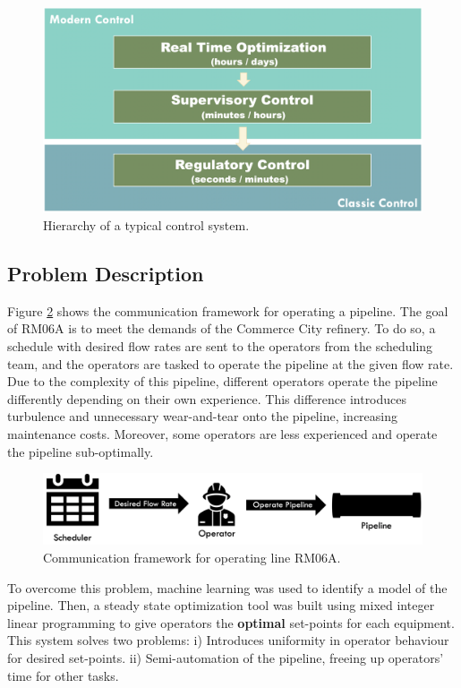\begin{figure}[h]
    \centering
    \includegraphics[scale=0.15]{images/08APC.png}
    \caption{Hierarchy of a typical control system.}
    \label{fig:08APC}
\end{figure}

\subsection{Problem Description}
Figure \ref{fig:08schedule} shows the communication framework for operating a pipeline. The goal of RM06A is to meet the demands of the Commerce City refinery. To do so, a schedule with desired flow rates are sent to the operators from the scheduling team, and the operators are tasked to operate the pipeline at the given flow rate. Due to the complexity of this pipeline, different operators operate the pipeline differently depending on their own experience.  This difference introduces turbulence and unnecessary wear-and-tear onto the pipeline, increasing maintenance costs. Moreover, some operators are less experienced and operate the pipeline sub-optimally.

\begin{figure}[h]
    \centering
    \includegraphics[scale=0.35]{images/08Schedule.png}
    \caption{Communication framework for operating line RM06A.}
    \label{fig:08schedule}
\end{figure}

To overcome this problem, machine learning was used to identify a model of the pipeline.  Then, a steady state optimization tool was built using mixed integer linear programming to give operators the \textbf{optimal} set-points for each equipment.  This system solves two problems: i) Introduces uniformity in operator behaviour for desired set-points. ii) Semi-automation of the pipeline, freeing up operators' time for other tasks.

